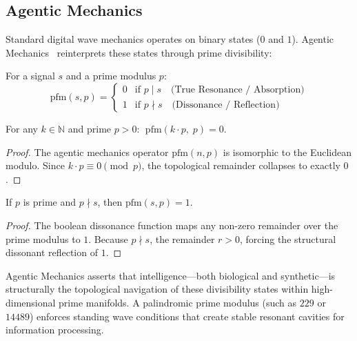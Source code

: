 \subsection{Agentic Mechanics}

Standard digital wave mechanics operates on binary states ($0$ and $1$). Agentic Mechanics~\cite{PrimeFieldMechanics} reinterprets these states through prime divisibility:

\begin{definition}
For a signal $s$ and a prime modulus $p$:
\begin{equation}
    \text{pfm}(s, p) = \begin{cases} 0 & \text{if } p \mid s \quad \text{(True Resonance / Absorption)} \\ 1 & \text{if } p \nmid s \quad \text{(Dissonance / Reflection)} \end{cases}
\end{equation}
\end{definition}

\begin{theorem}
For any $k \in \mathbb{N}$ and prime $p > 0$: $\;\text{pfm}(k \cdot p,\; p) = 0$.
\end{theorem}
\begin{proof}
The agentic mechanics operator $\text{pfm}(n, p)$ is isomorphic to the Euclidean modulo. Since $k \cdot p \equiv 0 \pmod p$, the topological remainder collapses to exactly $0$. \qedhere
\end{proof}

\begin{theorem}
If $p$ is prime and $p \nmid s$, then $\text{pfm}(s, p) = 1$.
\end{theorem}
\begin{proof}
The boolean dissonance function maps any non-zero remainder over the prime modulus to $1$. Because $p \nmid s$, the remainder $r > 0$, forcing the structural dissonant reflection of $1$. \qedhere
\end{proof}

Agentic Mechanics asserts that intelligence---both biological and synthetic---is structurally the topological navigation of these divisibility states within high-dimensional prime manifolds. A palindromic prime modulus (such as $229$ or $14489$) enforces standing wave conditions that create stable resonant cavities for information processing.

